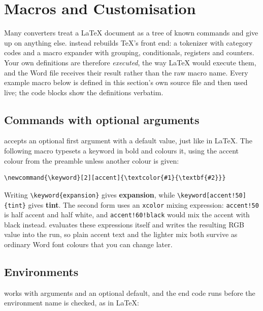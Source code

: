 \section{Macros and Customisation}\label{sec:macros}

Many converters treat a \LaTeX{} document as a tree of known commands and give up on
anything else. \texdocx{} instead rebuilds \TeX's front end: a tokenizer with category
codes and a macro expander with grouping, conditionals, registers and counters. Your own
definitions are therefore \emph{executed}, the way \LaTeX{} would execute them, and
the Word file receives their result rather than the raw macro name. Every example
macro below is defined in this section's own source file and then used live; the code
blocks show the definitions verbatim.

\subsection{Commands with optional arguments}

 accepts an optional first argument with a default value, just like in
\LaTeX. The following macro typesets a keyword in bold and colours it, using the accent
colour from the preamble unless another colour is given:

\begin{verbatim}
\newcommand{\keyword}[2][accent]{\textcolor{#1}{\textbf{#2}}}
\end{verbatim}
\newcommand{\keyword}[2][accent]{\textcolor{#1}{\textbf{#2}}}

Writing \verb|\keyword{expansion}| gives \keyword{expansion}, while
\verb|\keyword[accent!50]{tint}| gives \keyword[accent!50]{tint}. The second form uses an
\texttt{xcolor} mixing expression: \texttt{accent!50} is half accent and half white, and
\texttt{accent!60!black} would mix the accent with black instead. \texdocx{} evaluates
these expressions itself and writes the resulting RGB value into the run, so
\textcolor{accent}{plain accent text} and \textcolor{accent!50}{the lighter mix} both
survive as ordinary Word font colours that you can change later.

\subsection{Environments}

 works with arguments and an optional default, and the end code runs
before the environment name is checked, as in \LaTeX:

